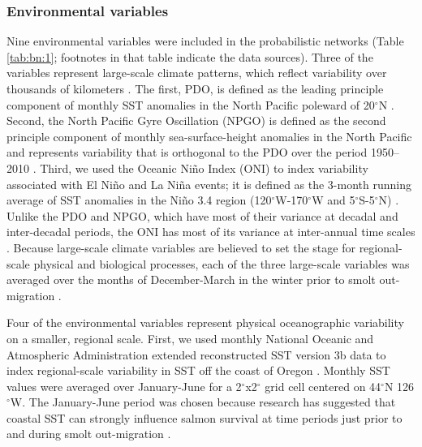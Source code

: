 \subsubsection{Environmental variables}

Nine environmental variables were included in the probabilistic networks (Table
\ref{tab:bn:1}; footnotes in that table indicate the data sources). Three of the variables
represent large-scale climate patterns, which reflect variability over thousands
of kilometers \citep{King2011}. The first, PDO, is defined as the leading
principle component of monthly SST anomalies in the North Pacific poleward of
20$^{\circ}$N \citep{Mantua1997a}.  Second, the North Pacific Gyre Oscillation (NPGO) is
defined as the second principle component of monthly sea-surface-height
anomalies in the North Pacific and represents variability that is orthogonal to
the PDO over the period 1950--2010 \citep{Di-Lorenzo2008a}. Third, we used the
Oceanic Ni\~{n}o Index (ONI) to index variability associated with El Ni\~{n}o and La
Ni\~{n}a events; it is defined as the 3-month running average of SST anomalies in
the Ni\~{n}o 3.4 region (120$^{\circ}$W-170$^{\circ}$W and 5$^{\circ}$S-5$^{\circ}$N) \citep{Trenberth1997}. Unlike the
PDO and NPGO, which have most of their variance at decadal and inter-decadal
periods, the ONI has most of its variance at inter-annual time scales
\citep{Sarachik2010a}. Because large-scale climate variables are believed to set
the stage for regional-scale physical and biological processes, each of the
three large-scale variables was averaged over the months of December-March in
the winter prior to smolt out-migration \citep{Mantua1997a, Yeh2011,
DiLorenzo2013a}.

Four of the environmental variables represent physical oceanographic variability
on a smaller, regional scale. First, we used monthly National Oceanic and
Atmospheric Administration extended reconstructed SST version 3b data to index
regional-scale variability in SST off the coast of Oregon \citep{Smith2008a}.
Monthly SST values were averaged over January-June for a 2$^{\circ}$x2$^{\circ}$ grid cell
centered on 44$^{\circ}$N 126$^{\circ}$W. The January-June period was chosen because research has
suggested that coastal SST can strongly influence salmon survival at time
periods just prior to and during smolt out-migration \citep{Mueter2005a}.


